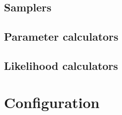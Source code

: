 \documentclass[draftmode,draftwater]{memarticle}
\begin{document}


\subsection{Samplers}


\subsection{Parameter calculators}

\subsection{Likelihood calculators}

\section{Configuration}

\end{document}
